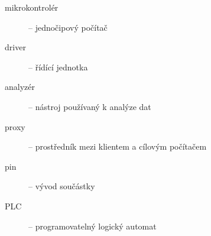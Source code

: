 \begin{description}
   \item[mikrokontrolér] -- jednočipový počítač
   \item[driver] -- řídící jednotka 
   \item[analyzér] -- nástroj používaný k analýze dat
   \item[proxy] -- prostředník mezi klientem a cílovým počítačem
    \item[pin] -- vývod součástky
    \item[PLC] -- programovatelný logický automat
\end{description}






